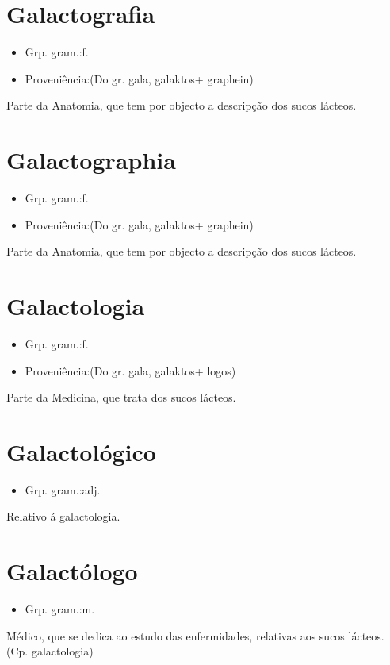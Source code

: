 \section{Galactografia}
\begin{itemize}
\item {Grp. gram.:f.}
\end{itemize}
\begin{itemize}
\item {Proveniência:(Do gr. \textunderscore gala\textunderscore , \textunderscore galaktos\textunderscore  + \textunderscore graphein\textunderscore )}
\end{itemize}
Parte da Anatomia, que tem por objecto a descripção dos sucos lácteos.
\section{Galactographia}
\begin{itemize}
\item {Grp. gram.:f.}
\end{itemize}
\begin{itemize}
\item {Proveniência:(Do gr. \textunderscore gala\textunderscore , \textunderscore galaktos\textunderscore  + \textunderscore graphein\textunderscore )}
\end{itemize}
Parte da Anatomia, que tem por objecto a descripção dos sucos lácteos.
\section{Galactologia}
\begin{itemize}
\item {Grp. gram.:f.}
\end{itemize}
\begin{itemize}
\item {Proveniência:(Do gr. \textunderscore gala\textunderscore , \textunderscore galaktos\textunderscore  + \textunderscore logos\textunderscore )}
\end{itemize}
Parte da Medicina, que trata dos sucos lácteos.
\section{Galactológico}
\begin{itemize}
\item {Grp. gram.:adj.}
\end{itemize}
Relativo á galactologia.
\section{Galactólogo}
\begin{itemize}
\item {Grp. gram.:m.}
\end{itemize}
Médico, que se dedica ao estudo das enfermidades, relativas aos sucos lácteos.
(Cp. \textunderscore galactologia\textunderscore )
